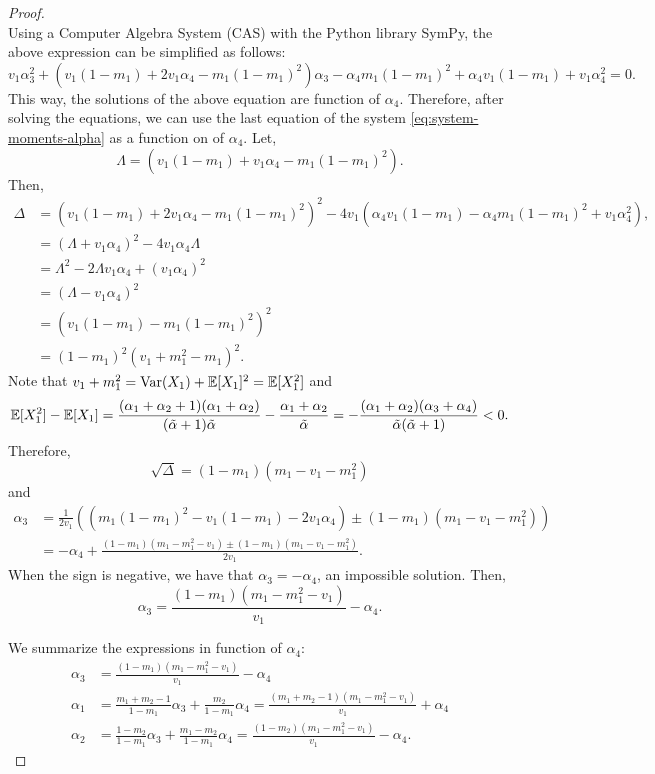 \begin{proof}
\begin{equation*}
\end{equation*}
Using a Computer Algebra System (CAS) with the Python library SymPy, the above
expression can be simplified as follows:
$$
v_1\alpha_3^2 + \left(v_1(1-m_1) + 2v_1\alpha_4 - m_1(1-m_1)^2\right)\alpha_3 - \alpha_4m_1(1-m_1)^2 + \alpha_4v_1(1 - m_1) + v_1\alpha_4^2 = 0.
$$
This way, the solutions of the above equation are function of $\alpha_4$.
Therefore, after solving the equations, we can use the last equation of the
system \eqref{eq:system-moments-alpha} as a function on of $\alpha_4$. Let, 
$$
\Lambda = \left(v_1(1-m_1) + v_1\alpha_4 - m_1(1-m_1)^2\right).
$$
Then, 
\begin{equation*}
  \begin{split}
    \Delta &= \left(v_1(1-m_1) + 2v_1\alpha_4 - m_1(1-m_1)^2\right)^2 - 4v_1(\alpha_4v_1(1 - m_1) - \alpha_4m_1(1-m_1)^2 + v_1\alpha_4^2), \\
    &= \left(\Lambda + v_1\alpha_4\right)^2 - 4v_1\alpha_4\Lambda \\
    &= \Lambda^2 - 2\Lambda v_1\alpha_4 + (v_1\alpha_4)^2 \\
    &= (\Lambda - v_1\alpha_4)^2 \\
    &= \left(v_1(1-m_1) - m_1(1-m_1)^2\right)^2 \\ 
    &= (1 - m_1)^2(v_1 + m_1^2 - m_1)^2.
  \end{split}
\end{equation*}
Note that $v_1 + m_1^2 = \operatorname{Var}(X_1) + \mathbb{E}[X_1]^2 = \mathbb{E}[X_1^2]$ and
$$
\mathbb{E}[X_1^2] - \mathbb{E}[X_1] = \frac{(\alpha_1 + \alpha_2 + 1)(\alpha_1 + \alpha_2)}{(\tilde{\alpha} + 1)\tilde{\alpha}} - \frac{\alpha_1 + \alpha_2}{\tilde{\alpha}} = -\frac{(\alpha_1 + \alpha_2)(\alpha_3 + \alpha_4)}{\tilde{\alpha}(\tilde{\alpha}+1)} < 0.
$$
Therefore, 
$$
\sqrt{\Delta} = (1-m_1)(m_1 - v_1 - m_1^2)
$$
and 
\begin{equation*}
  \begin{split}
    \alpha_3 &= \frac{1}{2v_1}\left(\left(m_1(1-m_1)^2 - v_1(1-m_1) - 2v_1\alpha_4\right) \pm (1-m_1)(m_1 - v_1 - m_1^2)\right) \\
    &= - \alpha_4 + \frac{(1-m_1)(m_1 - m_1^2 - v_1) \pm (1-m_1)(m_1-v_1-m_1^2)}{2v_1}.
  \end{split}
\end{equation*}
When the sign is negative, we have that $\alpha_3 = - \alpha_4$, an impossible
solution. Then, 
$$
\alpha_3 = \frac{(1-m_1)(m_1 - m_1^2 - v_1)}{v_1} - \alpha_4.
$$

We summarize the expressions in function of $\alpha_4$: 
\begin{align*}
  \alpha_3 &= \frac{(1-m_1)(m_1 - m_1^2 - v_1)}{v_1} - \alpha_4 \\
  \alpha_1 &= \frac{m_1+m_2-1}{1-m_1}\alpha_3 + \frac{m_2}{1-m_1}\alpha_4 = \frac{(m_1 + m_2 - 1)(m_1 - m_1^2 - v_1)}{v_1} + \alpha_4 \\
  \alpha_2 &= \frac{1-m_2}{1-m_1}\alpha_3 + \frac{m_1-m_2}{1-m_1}\alpha_4 = \frac{(1 - m_2)(m_1 - m_1^2 - v_1)}{v_1} - \alpha_4 .
\end{align*}


\end{proof}
